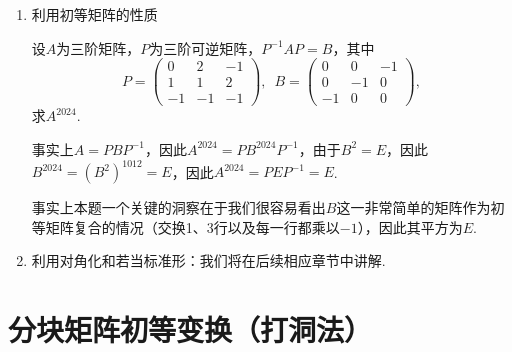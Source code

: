 \begin{enumerate}
          \begin{proof}
              \begin{enumerate}
                  \item 若$l\leqslant 2$，则$A^2=O$显然成立；

                  \item 若$l>2$，则由$A^l=O$可知$A$不可逆，故$r(A)\leqslant 1$，又$A\neq O$，因此$r(A)=1$，故$A^l=(\tr(A))^{l-1}A=O$，因此$\tr(A)=0$，故$A^2=\tr(A)A=O$.
              \end{enumerate}
          \end{proof}

    \item 利用初等矩阵的性质
          \begin{example}{}{}
              设$A$为三阶矩阵，$P$为三阶可逆矩阵，$P^{-1}AP=B$，其中
              \[P=\begin{pmatrix}
                      0 & 2 & -1 \\ 1 & 1 & 2 \\ -1 & -1 & -1
                  \end{pmatrix},\enspace B=\begin{pmatrix}
                      0 & 0 & -1 \\ 0 & -1 & 0 \\ -1 & 0 & 0
                  \end{pmatrix},\]
              求$A^{2024}$.
          \end{example}
          \begin{solution}
              事实上$A=PBP^{-1}$，因此$A^{2024}=PB^{2024}P^{-1}$，由于$B^2=E$，因此$B^{2024}=(B^2)^{1012}=E$，因此$A^{2024}=PEP^{-1}=E$.
          \end{solution}

          事实上本题一个关键的洞察在于我们很容易看出$B$这一非常简单的矩阵作为初等矩阵复合的情况（交换1、3行以及每一行都乘以$-1$），因此其平方为$E$.

    \item 利用对角化和若当标准形：我们将在后续相应章节中讲解.
\end{enumerate}

\section{分块矩阵初等变换（打洞法）} \label{sec:分块矩阵初等变换}

